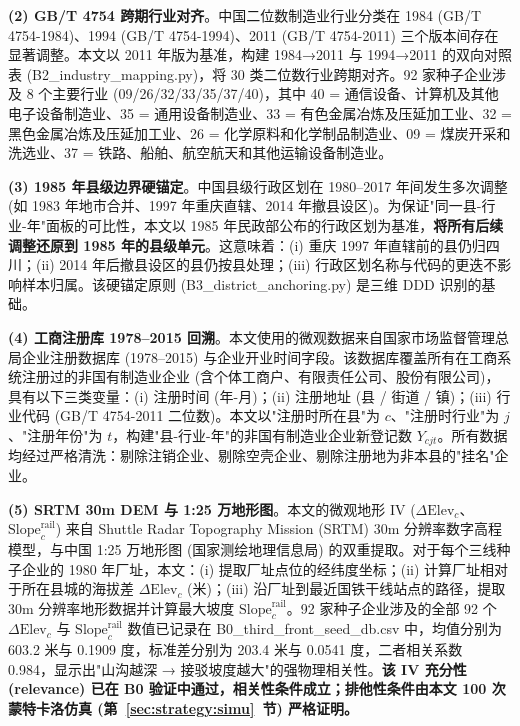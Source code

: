 \textbf{(2) GB/T 4754 跨期行业对齐}。中国二位数制造业行业分类在 1984 (GB/T 4754-1984)、1994 (GB/T 4754-1994)、2011 (GB/T 4754-2011) 三个版本间存在显著调整。本文以 2011 年版为基准，构建 1984→2011 与 1994→2011 的双向对照表 (B2\_industry\_mapping.py)，将 30 类二位数行业跨期对齐。92 家种子企业涉及 8 个主要行业 (09/26/32/33/35/37/40)，其中 40 = 通信设备、计算机及其他电子设备制造业、35 = 通用设备制造业、33 = 有色金属冶炼及压延加工业、32 = 黑色金属冶炼及压延加工业、26 = 化学原料和化学制品制造业、09 = 煤炭开采和洗选业、37 = 铁路、船舶、航空航天和其他运输设备制造业。

\textbf{(3) 1985 年县级边界硬锚定}。中国县级行政区划在 1980--2017 年间发生多次调整 (如 1983 年地市合并、1997 年重庆直辖、2014 年撤县设区)。为保证"同一县-行业-年"面板的可比性，本文以 1985 年民政部公布的行政区划为基准，\textbf{将所有后续调整还原到 1985 年的县级单元}。这意味着：(i) 重庆 1997 年直辖前的县仍归四川；(ii) 2014 年后撤县设区的县仍按县处理；(iii) 行政区划名称与代码的更迭不影响样本归属。该硬锚定原则 (B3\_district\_anchoring.py) 是三维 DDD 识别的基础。

\textbf{(4) 工商注册库 1978--2015 回溯}。本文使用的微观数据来自国家市场监督管理总局企业注册数据库 (1978--2015) 与企业开业时间字段。该数据库覆盖所有在工商系统注册过的非国有制造业企业 (含个体工商户、有限责任公司、股份有限公司)，具有以下三类变量：(i) 注册时间 (年-月)；(ii) 注册地址 (县 / 街道 / 镇)；(iii) 行业代码 (GB/T 4754-2011 二位数)。本文以"注册时所在县"为 $c$、"注册时行业"为 $j$、"注册年份"为 $t$，构建"县-行业-年"的非国有制造业企业新登记数 $Y_{cjt}$。所有数据均经过严格清洗：剔除注销企业、剔除空壳企业、剔除注册地为非本县的"挂名"企业。

\textbf{(5) SRTM 30m DEM 与 1:25 万地形图}。本文的微观地形 IV ($\Delta \mathrm{Elev}_{c}$、$\mathrm{Slope}_{c}^{\mathrm{rail}}$) 来自 Shuttle Radar Topography Mission (SRTM) 30m 分辨率数字高程模型，与中国 1:25 万地形图 (国家测绘地理信息局) 的双重提取。对于每个三线种子企业的 1980 年厂址，本文：(i) 提取厂址点位的经纬度坐标；(ii) 计算厂址相对于所在县城的海拔差 $\Delta \mathrm{Elev}_{c}$ (米)；(iii) 沿厂址到最近国铁干线站点的路径，提取 30m 分辨率地形数据并计算最大坡度 $\mathrm{Slope}_{c}^{\mathrm{rail}}$。92 家种子企业涉及的全部 92 个 $\Delta \mathrm{Elev}_{c}$ 与 $\mathrm{Slope}_{c}^{\mathrm{rail}}$ 数值已记录在 B0\_third\_front\_seed\_db.csv 中，均值分别为 603.2 米与 0.1909 度，标准差分别为 203.4 米与 0.0541 度，二者相关系数 0.984，显示出"山沟越深 → 接驳坡度越大"的强物理相关性。\textbf{该 IV 充分性 (relevance) 已在 B0 验证中通过，相关性条件成立；排他性条件由本文 100 次蒙特卡洛仿真 (第~\ref{sec:strategy:simu}~节) 严格证明。}

